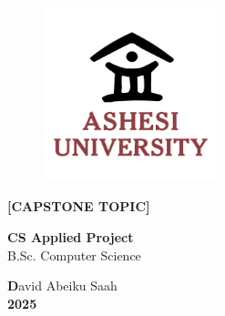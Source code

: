 \documentclass[a4paper,12pt,oneside]{report}
\begin{document}
\renewcommand{\contentsname}{Table of Contents}
\newcommand{\mychapter}[2]{
	\setcounter{chapter}{#1}
	\setcounter{section}{0}
	\chapter*{#2}
	\addcontentsline{toc}{chapter}{#2}
}



\newcommand{\projecttitle}{[CAPSTONE TOPIC]} %
\newcommand{\projectauthor}{David Abeiku Saah} %
\newcommand{\projecttype}{CS Applied Project}


\begin{titlepage}
	\begin{figure}[t]
		\centering\includegraphics[width=0.45\textwidth]{images/Ashesi-Logo Coloured.png}
	\end{figure}
	\vspace{27mm}
	\begin{center}

		\vspace{27mm}
		\vspace{27mm}

		\textsc{
			\large{\textbf{\projecttitle\\}}
		}
		\vspace{27mm}

		\textnormal{\large{\textbf{\uppercase \projecttype}\\}}
		\textup{B.Sc. Computer Science}\\
		\vspace{27mm}

		\textup{ \large \textbf \projectauthor}\\
		\textup{ \large \textbf{2025}}\\
	\end{center}

\end{titlepage}
\end{document}
